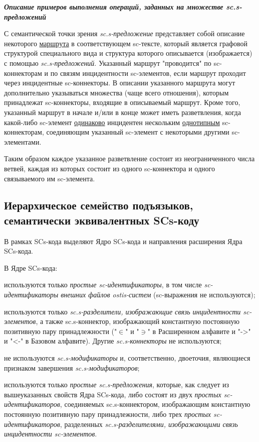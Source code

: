 \textbf{\textit{Описание примеров выполнения операций, заданных на множестве sc.s-предложений}}

С семантической точки зрения \textit{sc.s-предложение} представляет собой описание некоторого \uline{маршрута} в соответствующем sc-тексте, который является графовой структурой специального вида и структура которого описывается (изображается) с помощью \textit{sc.s-предложений}. Указанный маршрут "проводится"{} по sc-коннекторам и по связям инцидентности sc-элементов, если маршрут проходит через инцидентные sc-коннекторы. В описании указанного маршрута могут дополнительно указываться множества (чаще всего отношения), которым принадлежат sc-коннекторы, входящие в описываемый маршрут. Кроме того, указанный маршрут в начале и/или в конце может иметь разветвления, когда какой-либо sc-элемент \uline{одинаково} инцидентен нескольким \uline{однотипным} sc-коннекторам, соединяющим указанный sc-элемент с некоторыми другими sc-элементами.

Таким образом каждое указанное разветвление состоит из неограниченного числа ветвей, каждая из которых состоит из одного sc-коннектора и одного связываемого им sc-элемента.


\subsection{Иерархическое семейство подъязыков, семантически эквивалентных SCs-коду}


В рамках SCs-кода выделяют Ядро SCs-кода и направления расширения Ядра SCs-кода.

\begin{SCn}
\end{SCn}

В Ядре SCs-кода:
\begin{textitemize}
	\item используются только \textit{простые sc-идентификаторы}, в том числе \textit{sc-идентификаторы внешних файлов ostis-систем} (sc-выражения не используются);
	\item используются только \textit{sc.s-разделители, изображающие связь инцидентности sc-элементов}, а также sc.s-коннектор, изображающий константную  постоянную позитивную пару принадлежности ("$\in$"{} и "$\ni$"{} в Расширенном алфавите и "{}->{}"{} и "{}<-{}"{} в Базовом алфавите). Другие \textit{sc.s-коннекторы} не используются;
	\item не используются \textit{sc.s-модификаторы} и, соответственно, двоеточия, являющиеся признаком завершения \textit{sc.s-модификаторов};
	\item используются только \textit{простые sc.s-предложения}, которые, как следует из вышеуказанных свойств Ядра SCs-кода, либо состоят из двух \textit{простых sc-идентификаторов}, соединяемых sc.s-коннектором, изображающим константную  постоянную позитивную пару принадлежности, либо трех \textit{простых sc-идентификаторов}, разделенных \textit{sc.s-разделителями, изображающими связь инцидентности sc-элементов}.
\end{textitemize}


